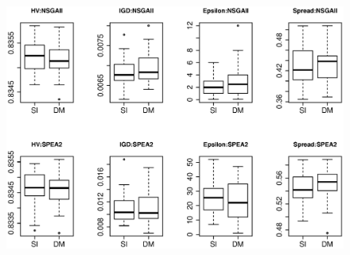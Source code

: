 \documentclass[review]{elsarticle}
\theoremstyle{definition}
\begin{document}
\begin{figure}[h]
\includegraphics[scale=0.60]{Compare_SI_DivMax.eps}
\end{figure}
\end{document}

